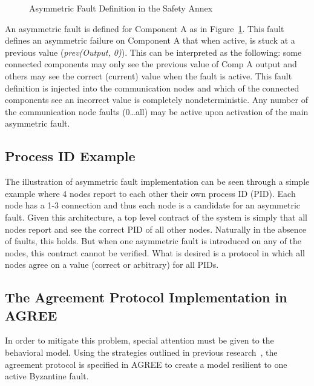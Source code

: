 \begin{figure}[!htb]
        \caption{\label{fig:asymFaultDef} Asymmetric Fault Definition in the Safety Annex}
\end{figure}

An asymmetric fault is defined for Component A as in Figure~\ref{fig:asymFaultDef}. This fault defines an asymmetric failure on Component A that when active, is stuck at a previous value (\textit{prev(Output, 0)}). This can be interpreted as the following: some connected components may only see the previous value of Comp A output and others may see the correct (current) value when the fault is active. This fault definition is injected into the communication nodes and which of the connected components see an incorrect value is completely nondeterministic. Any number of the communication node faults (0…all) may be active upon activation of the main asymmetric fault.

\subsection{Process ID Example}
The illustration of asymmetric fault implementation can be seen through a simple example where 4 nodes report to each other their own process ID (PID). Each node has a 1-3 connection and thus each node is a candidate for an asymmetric fault. Given this architecture, a top level contract of the system is simply that all nodes report and see the correct PID of all other nodes. Naturally in the absence of faults, this holds. But when one asymmetric fault is introduced on any of the nodes, this contract cannot be verified. What is desired is a protocol in which all nodes agree on a value (correct or arbitrary) for all PIDs. 

\subsection{The Agreement Protocol Implementation in AGREE}
In order to mitigate this problem, special attention must be given to the behavioral model. Using the strategies outlined in previous research~\cite{bracha1987asynchronous,Driscoll-Byzantine-Fault}, the agreement protocol is specified in AGREE to create a model resilient to one active Byzantine fault. 

